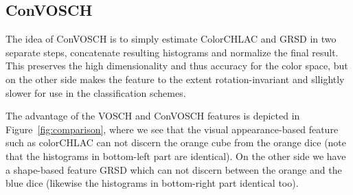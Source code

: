 \documentclass[conference]{sty/IEEEtran}
\begin{document}
\subsection{ConVOSCH}
The idea of ConVOSCH is to simply estimate ColorCHLAC and GRSD in two separate steps, 
concatenate resulting histograms and normalize the final result. This preserves the 
high dimensionality and thus accuracy for the color space, but on the other side 
makes the feature to the extent rotation-invariant and sllightly slower for use 
in the classification schemes.
\vspace{2ex}

The advantage of the VOSCH and ConVOSCH features is depicted in Figure~\ref{fig:comparison},
where we see that the visual appearance-based feature such as colorCHLAC can not
discern the orange cube from the orange dice (note that the histograms in bottom-left part are identical). 
On the other side we have a shape-based feature GRSD
which can not discern between the orange and the blue dice (likewise the
histograms in bottom-right part identical too).
\end{document}
